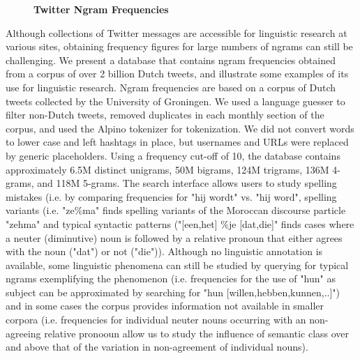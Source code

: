 \documentclass[10pt, a4paper, twopage, headinclude, footinclude, BCOR5mm]{book}
\begin{document}
\newpage

\begin{figure}[t!]
\centering
\large\textbf{Twitter Ngram Frequencies}
\vspace*{0.5cm}
\end{figure}


\begin{table}[t!]
\end{table} 
\noindent
Although collections of Twitter messages are accessible for linguistic research at various sites, obtaining frequency figures for large numbers of ngrams can still be challenging. We present a database that contains ngram frequencies  obtained from a corpus of over 2 billion Dutch tweets, and illustrate some examples of its use for linguistic research.   Ngram frequencies are based on a corpus of Dutch tweets collected by the University of Groningen.  We used a language guesser to filter non-Dutch tweets, removed duplicates in each monthly section of the corpus, and used the Alpino tokenizer for tokenization. We did not convert words to lower case and left hashtags in place, but usernames and URLs were replaced by generic placeholders.  Using a frequency cut-off of 10, the database contains approximately 6.5M distinct unigrams, 50M bigrams, 124M trigrams, 136M 4-grams, and 118M 5-grams.   The search interface allows users to study spelling mistakes (i.e. by comparing frequencies for "hij wordt" vs. "hij word", spelling variants (i.e.  "ze\%ma" finds spelling variants of the Moroccan discourse particle "zehma" and typical syntactic patterns ("[een,het] \%je [dat,die]" finds cases where a neuter (diminutive) noun is followed by a relative pronoun that either agrees with the noun ("dat") or not ("die")). Although no linguistic annotation is available, some linguistic phenomena can still be studied by querying for typical ngrams exemplifying the phenomenon (i.e. frequencies for the use of "hun" as subject can be approximated by searching for "hun [willen,hebben,kunnen,..]") and  in some cases the corpus provides information not available in smaller corpora (i.e. frequencies for individual neuter nouns occurring with an non-agreeing relative pronooun allow us to study the influence of semantic class over and above that  of the variation in non-agreement of individual nouns).  
\end{document}
